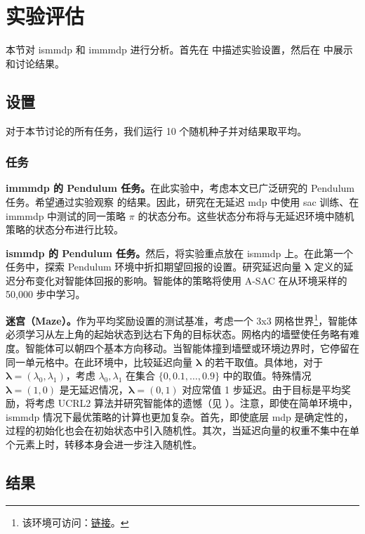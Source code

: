 \section{实验评估}
本节对 \gls{ismmdp} 和 \gls{immmdp} 进行分析。首先在  中描述实验设置，然后在  中展示和讨论结果。


\subsection{设置}
\label{subsec:setting_exp_mtd}
对于本节讨论的所有任务，我们运行 10 个随机种子并对结果取平均。

\subsubsection{任务}
\label{subsubsec:tasks_mtd}

\noindent\textbf{\gls{immmdp} 的 Pendulum 任务。}\indent 在此实验中，考虑本文已广泛研究的 Pendulum 任务。希望通过实验观察  的结果。因此，研究在无延迟 \gls{mdp} 中使用 \gls{sac} 训练、在 \gls{immmdp} 中测试的同一策略 $\pi$ 的状态分布。这些状态分布将与无延迟环境中随机策略的状态分布进行比较。

\noindent\textbf{\gls{ismmdp} 的 Pendulum 任务。}\indent 然后，将实验重点放在 \gls{ismmdp} 上。在此第一个任务中，探索 Pendulum 环境中折扣期望回报的设置。研究延迟向量 $\boldsymbol\lambda$ 定义的延迟分布变化对智能体回报的影响。智能体的策略将使用 A-SAC 在从环境采样的 50,000 步中学习。

\noindent\textbf{迷宫（Maze）。}\indent 作为平均奖励设置的测试基准，考虑一个 3x3 网格世界\footnote{该环境可访问：\href{https://github.com/MattChanTK/gym-maze}{链接}。}，智能体必须学习从左上角的起始状态到达右下角的目标状态。网格内的墙壁使任务略有难度。智能体可以朝四个基本方向移动。当智能体撞到墙壁或环境边界时，它停留在同一单元格中。在此环境中，比较延迟向量 $\boldsymbol\lambda$ 的若干取值。具体地，对于 $\boldsymbol\lambda=(\lambda_0,\lambda_1)$，考虑 $\lambda_0,\lambda_1$ 在集合 $\{0,0.1,\dots,0.9\}$ 中的取值。特殊情况 $\boldsymbol\lambda=(1,0)$ 是无延迟情况，$\boldsymbol\lambda=(0,1)$ 对应常值 1 步延迟。由于目标是平均奖励，将考虑 UCRL2 算法并研究智能体的遗憾（见 ）。注意，即使在简单环境中，\gls{ismmdp} 情况下最优策略的计算也更加复杂。首先，即使底层 \gls{mdp} 是确定性的，过程的初始化也会在初始状态中引入随机性。其次，当延迟向量的权重不集中在单个元素上时，转移本身会进一步注入随机性。

\subsection{结果}
\label{subsec:results_mtd}


